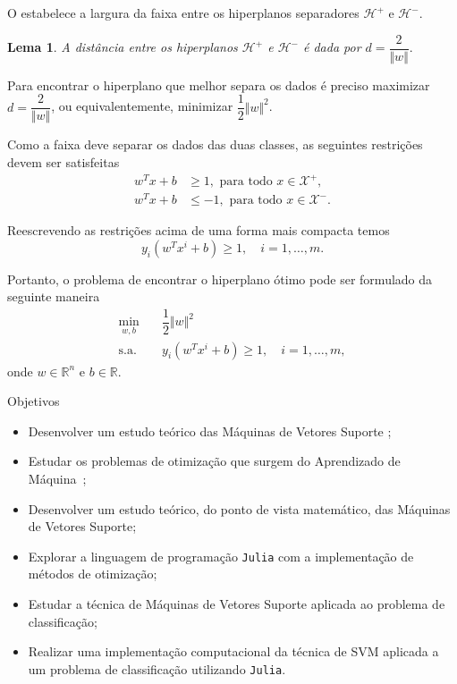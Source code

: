 \documentclass{beamer}
\def\Xset{\mathcal{X}}
\def\Hset{\mathcal{H}}
\def\RR{\mathds{R}}
\newtheorem{lema}{Lema}
\theoremstyle{definition}%
\begin{document}
\begin{frame}
O  estabelece a largura da faixa entre os hiperplanos separadores $\Hset^{+}$ e $\Hset^{-}$.

\begin{lema}\label{lema2} A distância entre os hiperplanos $\Hset^{+}$ e $\Hset^{-}$ é dada por $d=\dfrac{2}{\Vert w\Vert}.$
\end{lema}
\end{frame}


\begin{frame}
Para encontrar o hiperplano que melhor separa os dados é preciso maximizar $d=\dfrac{2}{\Vert w\Vert }$, ou equivalentemente, minimizar $\dfrac{1}{2}\Vert w\Vert^{2}$. 

Como a faixa deve separar os dados das duas classes, as seguintes restrições devem ser satisfeitas
\begin{align}
w^{T}x+b &\geq 1 , \text{ para  todo } x\in \Xset^{+}, \\
w^{T}x+b &\leq -1 , \text{ para  todo } x\in \Xset^{-}.
\end{align}

Reescrevendo as restrições acima de uma forma mais compacta temos
\[ y_{i}(w^{T}x^{i}+b)\geq 1, \quad i=1, \ldots ,m. \]
\end{frame}


\begin{frame}
Portanto, o problema de encontrar o hiperplano ótimo pode ser formulado da seguinte maneira
\[ \label{eq5}
\begin{aligned}
\min_{w,b} & \quad \dfrac{1}{2} \Vert w\Vert^{2} \\
\text{s.a.} &  \quad y_i(w^{T}x^{i}+b) \geq 1, \quad i=1, \ldots , m, \end{aligned}
\]
onde $w\in \RR^{n}$ e $b\in \RR$. 
\end{frame}


\begin{frame}{Objetivos}
\begin{itemize}
	\item Desenvolver um estudo teórico das Máquinas de Vetores Suporte \cite{Faisal2019,Evelin2017};

	\item Estudar os problemas de otimização que surgem do Aprendizado de Máquina~\cite{Ana1994,Ademir2013};

	\item Desenvolver um estudo teórico, do ponto de vista matemático, das Máquinas de Vetores Suporte;

	\item Explorar a linguagem de programação \texttt{Julia} com a implementação de métodos de otimização;

	\item Estudar a técnica de Máquinas de Vetores Suporte aplicada ao problema de classificação; 

	\item Realizar uma implementação computacional da técnica de SVM aplicada a um problema de classificação utilizando \texttt{Julia}.
\end{itemize}
\end{frame}
\end{document}
